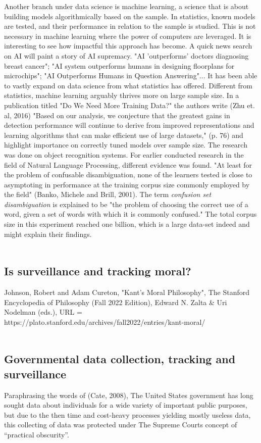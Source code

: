 \documentclass[11pt]{article}
\begin{document}
Another branch under data science is machine learning, a science that is about building models algorithmically based on the sample. In statistics, known models are tested, and their performance in relation to the sample is studied. This is not necessary in machine learning where the power of computers are leveraged. It is interesting to see how impactful this approach has become. A quick news search on AI will paint a story of AI supremacy. "AI 'outperforms' doctors diagnosing breast cancer"; "AI system outperforms humans in designing floorplans for microchips"; "AI Outperforms Humans in Question Answering"... It has been able to vastly expand on data science from what statistics has offered. Different from statistics, machine learning arguably thrives more on large sample size. In a publication titled "Do We Need More Training Data?" the authors write (Zhu et. al, 2016) "Based on our analysis, we conjecture that the greatest gains in detection performance will continue to derive from improved representations and learning algorithms that can make efficient use of large datasets," (p. 76) and highlight importance on correctly tuned models over sample size. The research was done on object recognition systems. For earlier conducted research in the field of Natural Language Processing, different evidence was found. "At least for the problem of confusable disambiguation, none of the learners tested is close to asymptoting in performance at the training corpus size commonly employed by the field" (Banko, Michele and Brill, 2001). The term \textit{confusion set disambiguation} is explained to be "the problem of choosing the correct use of a word, given a set of words with which it is commonly confused." The total corpus size in this experiment reached one billion, which is a large data-set indeed and might explain their findings. \\ \\

\subsection{Is surveillance and tracking moral?}


Johnson, Robert and Adam Cureton, "Kant’s Moral Philosophy", The Stanford Encyclopedia of Philosophy (Fall 2022 Edition), Edward N. Zalta \& Uri Nodelman (eds.), URL = https://plato.stanford.edu/archives/fall2022/entries/kant-moral/\.\\ \\

\subsection{Governmental data collection, tracking and surveillance}
Paraphrasing the words of (Cate, 2008), The United States government has long sought data about individuals for a wide variety of important public purposes, but due to the then time and cost-heavy processes yielding mostly useless data, this collecting of data was protected under The Supreme Courts concept of “practical obscurity”.  \\ \\
\end{document}
